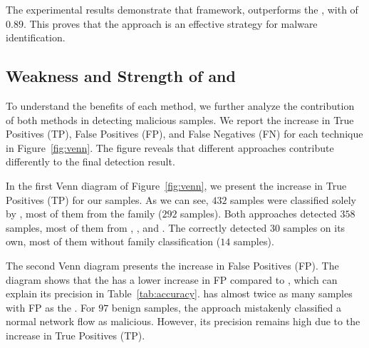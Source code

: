 \begin{finding}
The experimental results demonstrate that \droidxpflow framework, outperforms the \mas, with \fone of $0.89$. This proves that the approach is an effective strategy for malware identification.
\end{finding}


\begin{table}
  \caption{Accuracy of both strategy on \fds (1220 samples).}
  \label{tab:accuracy}
\end{table}


\subsection{Weakness and Strength of \net and \mas}\label{sec:strategy}

To understand the benefits of each method, we further analyze the contribution of both methods in detecting malicious samples. We report the increase in True Positives (TP), False Positives (FP), and False Negatives (FN) for each technique in Figure~\ref{fig:venn}. The figure reveals that different approaches contribute differently to the final detection result.

In the first Venn diagram of Figure~\ref{fig:venn}, we present the increase in True Positives (TP) for our samples. As we can see, $432$ samples were classified solely by \droidxpflow, most of them from the \gps family ($292$ samples). Both approaches detected $358$ samples, most of them from \gps, , and \dwg. The \mas correctly detected $30$ samples on its own, most of them without family classification ($14$ samples).

The second Venn diagram presents the increase in False Positives (FP). The diagram shows that the \mas has a lower increase in FP compared to \droidxpflow, which can explain its precision in Table~\ref{tab:accuracy}. \droidxpflow has almost twice as many samples with FP as the \mas. For $97$ benign samples, the approach mistakenly classified a normal network flow as malicious. However, its precision remains high due to the increase in True Positives (TP).

